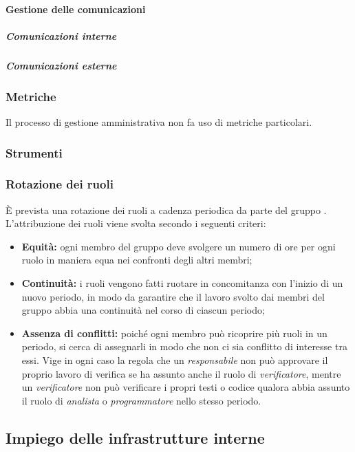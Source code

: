   \paragraph{Gestione delle comunicazioni}
  \subparagraph{Comunicazioni interne}

  \subparagraph{Comunicazioni esterne}
  \subsubsection{Metriche}
  Il processo di gestione amministrativa non fa uso di metriche particolari.
  \subsubsection{Strumenti}
      \subsubsection{Rotazione dei ruoli}
      È prevista una rotazione dei ruoli a cadenza periodica da parte del gruppo \groupName.\\
      L'attribuzione dei ruoli viene svolta secondo i seguenti criteri:
      \begin{itemize}
        \item \textbf{Equità:} ogni membro del gruppo deve svolgere un numero di ore per ogni ruolo in maniera equa nei confronti degli altri membri;
        \item \textbf{Continuità:} i ruoli vengono fatti ruotare in concomitanza con l'inizio di un nuovo periodo, in modo da garantire che il lavoro svolto dai membri del gruppo abbia una continuità nel corso di ciascun periodo;
        \item \textbf{Assenza di conflitti:} poiché ogni membro può ricoprire più ruoli in un periodo, si cerca di assegnarli in modo che non ci sia conflitto di interesse tra essi. Vige in ogni caso la regola che un \textit{responsabile} non può approvare il proprio lavoro di verifica se ha assunto anche il ruolo di \textit{verificatore}, mentre un \textit{verificatore} non può verificare i propri testi o codice qualora abbia assunto il ruolo di \textit{analista} o \textit{programmatore} nello stesso periodo.
      \end{itemize}


  \subsection{Impiego delle infrastrutture interne} \label{subsection:infrastrutture_interne}

